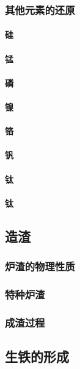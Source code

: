 \documentclass[UTF8]{../../ApplicationUniverse}
\begin{document}
        \subsubsection{其他元素的还原}
            \paragraph{硅}
            \paragraph{锰}
            \paragraph{磷}
            \paragraph{镍}
            \paragraph{铬}
            \paragraph{钒}
            \paragraph{钛}
            \paragraph{钛}
    \subsection{造渣}
        \subsubsection{炉渣的物理性质}
        \subsubsection{特种炉渣}
        \subsubsection{成渣过程}
    \subsection{生铁的形成}
\end{document}
